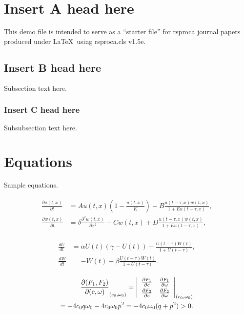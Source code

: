 \documentclass{rsproca}%
\begin{document}
\begin{fmtext}
\section{Insert A head here}

This demo file is intended to serve as a ``starter file''
for rsproca journal papers produced under \LaTeX\ using
rsproca.cls v1.5e.

\subsection{Insert B head here}
Subsection text here.

\subsubsection{Insert C head here}
Subsubsection text here.

\section{Equations}

Sample equations.

\begin{align}\label{1.1}
\begin{split}
\frac{\partial u(t,x)}{\partial t} &= Au(t,x) \left(1-\frac{u(t,x)}{K}\right)-B\frac{u(t-\tau,x) w(t,x)}{1+Eu(t-\tau,x)},\\
\frac{\partial w(t,x)}{\partial t} &=\delta \frac{\partial^2w(t,x)}{\partial x^2}-Cw(t,x)+D\frac{u(t-\tau,x)w(t,x)}{1+Eu(t-\tau,x)},
\end{split}
\end{align}

\begin{align}\label{1.2}
\begin{split}
\frac{dU}{dt} &=\alpha U(t)(\gamma -U(t))-\frac{U(t-\tau)W(t)}{1+U(t-\tau)},\\
\frac{dW}{dt} &=-W(t)+\beta\frac{U(t-\tau)W(t)}{1+U(t-\tau)}.
\end{split}
\end{align}

\begin{eqnarray}
\frac{\partial(F_1,F_2)}{\partial(c,\omega)}_{(c_0,\omega_0)} = \left|
\begin{array}{ll}
\frac{\partial F_1}{\partial c} &\frac{\partial F_1}{\partial \omega} \\\noalign{\vskip3pt}
\frac{\partial F_2}{\partial c}&\frac{\partial F_2}{\partial \omega}
\end{array}\right|_{(c_0,\omega_0)}\notag\\
=-4c_0q\omega_0 -4c_0\omega_0p^2 =-4c_0\omega_0(q+p^2)>0.
\end{eqnarray}
\end{fmtext}
\end{document}
